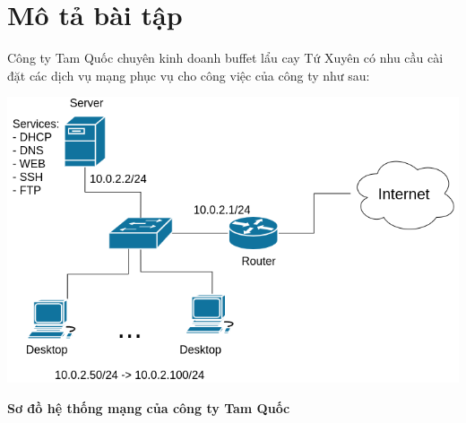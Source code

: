 \documentclass[a4paper]{article} %
\renewcommand{\figurename}{\fontsize{12pt}{0pt}\selectfont \bfseries Hình}
\begin{document}


\tableofcontents
\thispagestyle{empty}
\cleardoublepage


{
  \let\oldnumberline\numberline
  \renewcommand{\numberline}{\figurename~\oldnumberline}
  \listoffigures
}
\cleardoublepage


\section*{Mô tả bài tập}

Công ty Tam Quốc chuyên kinh doanh buffet lẩu cay Tứ Xuyên có nhu cầu cài đặt
các dịch vụ mạng phục vụ cho công việc của công ty như sau:

\setcounter{section}{0}
\setcounter{subsection}{1}
\setcounter{figure}{0}
\begin{minipage}{.93\linewidth}
  \captionsetup{type=figure}
  \includegraphics[width=\linewidth]{./imgs/Hinh-1.png}
  \caption{\bfseries Sơ đồ hệ thống mạng của công ty Tam Quốc}
\end{minipage}

\setcounter{subsection}{0}

\newpage
\end{document}

